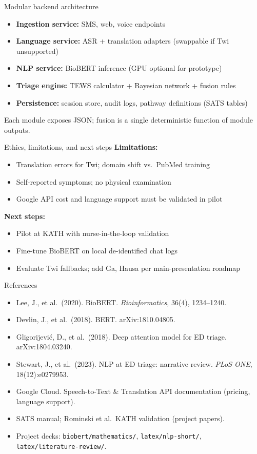 \documentclass[aspectratio=169,11pt]{beamer}
\begin{document}
\begin{frame}{Modular backend architecture}
	\begin{itemize}
		\item \textbf{Ingestion service:} SMS, web, voice endpoints
		\item \textbf{Language service:} ASR + translation adapters (swappable if Twi unsupported)
		\item \textbf{NLP service:} BioBERT inference (GPU optional for prototype)
		\item \textbf{Triage engine:} TEWS calculator + Bayesian network + fusion rules
		\item \textbf{Persistence:} session store, audit logs, pathway definitions (SATS tables)
	\end{itemize}

	\vspace{0.3em}
	Each module exposes JSON; fusion is a single deterministic function of module outputs.
\end{frame}

\begin{frame}{Ethics, limitations, and next steps}
	\textbf{Limitations:}
	\begin{itemize}
		\item Translation errors for Twi; domain shift vs.\ PubMed training
		\item Self-reported symptoms; no physical examination
		\item Google API cost and language support must be validated in pilot
	\end{itemize}

	\textbf{Next steps:}
	\begin{itemize}
		\item Pilot at KATH with nurse-in-the-loop validation
		\item Fine-tune BioBERT on local de-identified chat logs
		\item Evaluate Twi fallbacks; add Ga, Hausa per main-presentation roadmap
	\end{itemize}
\end{frame}

\begin{frame}{References}
	\footnotesize
	\begin{itemize}
		\item Lee, J., et al.\ (2020). BioBERT. \textit{Bioinformatics}, 36(4), 1234--1240.
		\item Devlin, J., et al.\ (2018). BERT. arXiv:1810.04805.
		\item Gligorijevi\'c, D., et al.\ (2018). Deep attention model for ED triage. arXiv:1804.03240.
		\item Stewart, J., et al.\ (2023). NLP at ED triage: narrative review. \textit{PLoS ONE}, 18(12):e0279953.
		\item Google Cloud. Speech-to-Text \& Translation API documentation (pricing, language support).
		\item SATS manual; Rominski et al.\ KATH validation (project papers).
		\item Project decks: \texttt{biobert/mathematics/}, \texttt{latex/nlp-short/}, \texttt{latex/literature-review/}.
	\end{itemize}
\end{frame}
\end{document}
